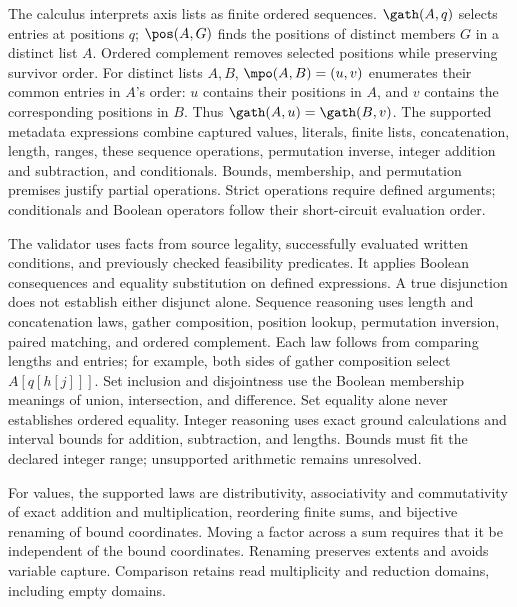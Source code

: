 The calculus interprets axis lists as finite ordered sequences.
$\gath(A,q)$ selects entries at positions $q$; $\pos(A,G)$ finds the
positions of distinct members $G$ in a distinct list $A$. Ordered
complement removes selected positions while preserving survivor order.
For distinct lists $A,B$, $\mpo(A,B)=(u,v)$ enumerates their common entries
in $A$'s order: $u$ contains their positions in $A$, and $v$ contains the
corresponding positions in $B$. Thus $\gath(A,u)=\gath(B,v)$.
The supported metadata expressions combine captured values, literals,
finite lists, concatenation, length, ranges, these sequence operations,
permutation inverse, integer addition and subtraction, and conditionals.
Bounds, membership, and permutation premises justify partial operations.
Strict operations require defined arguments; conditionals and Boolean
operators follow their short-circuit evaluation order.

The validator uses facts from source legality, successfully evaluated
written conditions, and previously checked feasibility predicates. It
applies Boolean consequences and equality substitution on defined
expressions. A true disjunction does not establish either disjunct alone.
Sequence reasoning uses length and concatenation laws, gather composition,
position lookup, permutation inversion, paired matching, and ordered
complement. Each law follows from comparing lengths and entries; for
example, both sides of gather composition select $A[q[h[j]]]$.
Set inclusion and disjointness use the Boolean membership meanings of
union, intersection, and difference. Set equality alone never establishes
ordered equality. Integer reasoning uses exact ground calculations and
interval bounds for addition, subtraction, and lengths. Bounds must fit
the declared integer range; unsupported arithmetic remains unresolved.

For values, the supported laws are distributivity, associativity and
commutativity of exact addition and multiplication, reordering finite
sums, and bijective renaming of bound coordinates. Moving a factor across
a sum requires that it be independent of the bound coordinates. Renaming
preserves extents and avoids variable capture. Comparison retains read
multiplicity and reduction domains, including empty domains.


